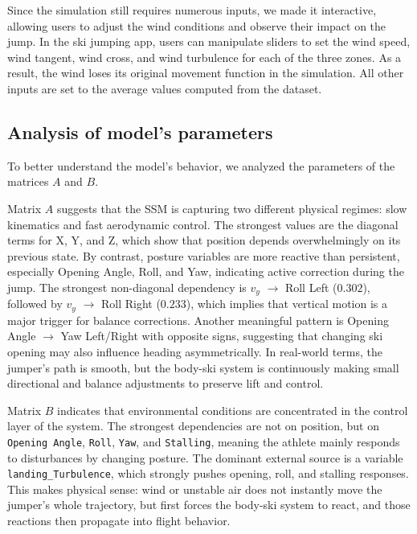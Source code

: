 \documentclass[sigconf,natbib=false, language=english]{acmart}
\begin{document}

Since the simulation still requires numerous inputs, we made it interactive,
allowing users to adjust the wind conditions and observe their impact on the
jump. In the ski jumping app, users can manipulate sliders to set the wind
speed, wind tangent, wind cross, and wind turbulence for each of the three
zones. As a result, the wind loses its original movement function in the
simulation. All other inputs are set to the average values computed from the
dataset.



\subsection{Analysis of model's parameters}
To better understand the model's behavior, we analyzed the parameters of the 
matrices $A$ and $B$. 

Matrix $A$ suggests that the SSM is capturing two different physical regimes: 
slow kinematics and fast aerodynamic control. The strongest values are the 
diagonal terms for X, Y, and Z, which show that position depends overwhelmingly 
on its previous state. By contrast, posture variables are more reactive than 
persistent, especially Opening Angle, Roll, and Yaw, indicating active correction 
during the jump. The strongest non-diagonal dependency is $v_y$ $\rightarrow$  Roll Left ($0.302$), 
followed by $v_y$ $\rightarrow$ Roll Right ($0.233$), which implies that vertical motion is a major 
trigger for balance corrections. Another meaningful pattern is Opening Angle $\rightarrow$ Yaw 
Left/Right with opposite signs, suggesting that changing ski opening may also 
influence heading asymmetrically. In real-world terms, the jumper's path is smooth, 
but the body-ski system is continuously making small directional and balance adjustments 
to preserve lift and control.

Matrix $B$ indicates that environmental conditions are concentrated in the control layer 
of the system. The strongest dependencies are not on position, but on \texttt{Opening Angle}, 
\texttt{Roll}, \texttt{Yaw}, and \texttt{Stalling}, meaning the athlete mainly responds to 
disturbances by changing posture. The dominant external source is a variable
\texttt{landing\_Turbulence}, which strongly pushes opening, roll, and stalling responses. 
This makes physical sense: wind or unstable air does not instantly move the jumper's whole 
trajectory, but first forces the body-ski system to react, and those reactions then propagate 
into flight behavior.
\end{document}
